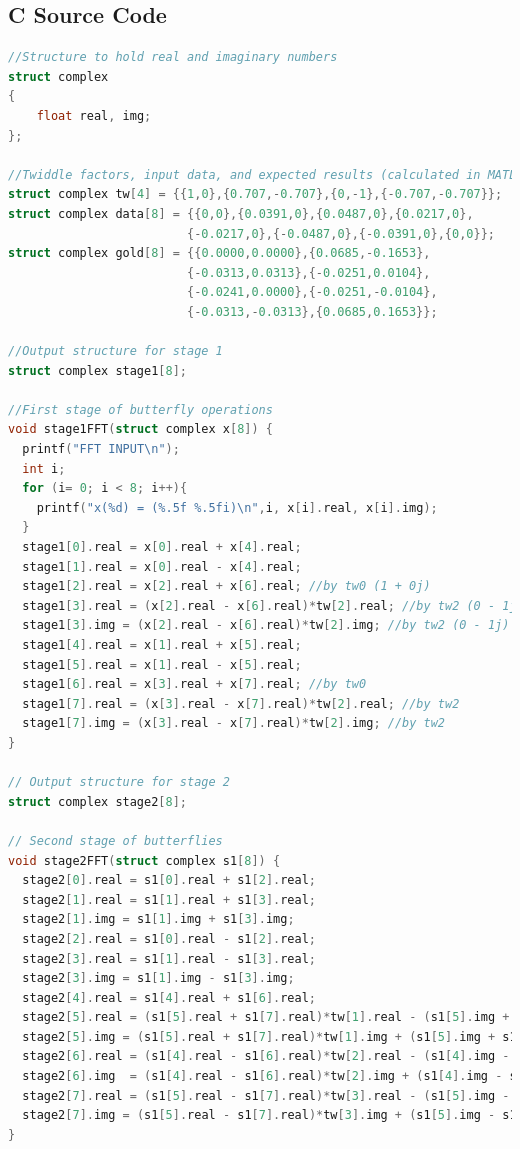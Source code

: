 \documentclass[12pt,a4paper]{report} %
\begin{document}
\begin{appendices}
\makeatletter
\def\toclevel@chapter{1}\def\toclevel@section{2}
\makeatother
\chapter{C Source Code}
\begin{lstlisting}[captionpos=b,language=C,frame=single]
//Structure to hold real and imaginary numbers
struct complex
{
    float real, img;
};

//Twiddle factors, input data, and expected results (calculated in MATLAB)
struct complex tw[4] = {{1,0},{0.707,-0.707},{0,-1},{-0.707,-0.707}};
struct complex data[8] = {{0,0},{0.0391,0},{0.0487,0},{0.0217,0},
                         {-0.0217,0},{-0.0487,0},{-0.0391,0},{0,0}};
struct complex gold[8] = {{0.0000,0.0000},{0.0685,-0.1653},
                         {-0.0313,0.0313},{-0.0251,0.0104},
                         {-0.0241,0.0000},{-0.0251,-0.0104},
                         {-0.0313,-0.0313},{0.0685,0.1653}};

//Output structure for stage 1
struct complex stage1[8];

//First stage of butterfly operations
void stage1FFT(struct complex x[8]) {
  printf("FFT INPUT\n");
  int i;
  for (i= 0; i < 8; i++){
    printf("x(%d) = (%.5f %.5fi)\n",i, x[i].real, x[i].img);
  }
  stage1[0].real = x[0].real + x[4].real;
  stage1[1].real = x[0].real - x[4].real;
  stage1[2].real = x[2].real + x[6].real; //by tw0 (1 + 0j)
  stage1[3].real = (x[2].real - x[6].real)*tw[2].real; //by tw2 (0 - 1j)
  stage1[3].img = (x[2].real - x[6].real)*tw[2].img; //by tw2 (0 - 1j)
  stage1[4].real = x[1].real + x[5].real;
  stage1[5].real = x[1].real - x[5].real;
  stage1[6].real = x[3].real + x[7].real; //by tw0
  stage1[7].real = (x[3].real - x[7].real)*tw[2].real; //by tw2
  stage1[7].img = (x[3].real - x[7].real)*tw[2].img; //by tw2
}

// Output structure for stage 2
struct complex stage2[8];

// Second stage of butterflies
void stage2FFT(struct complex s1[8]) {
  stage2[0].real = s1[0].real + s1[2].real;
  stage2[1].real = s1[1].real + s1[3].real;
  stage2[1].img = s1[1].img + s1[3].img;
  stage2[2].real = s1[0].real - s1[2].real;
  stage2[3].real = s1[1].real - s1[3].real;
  stage2[3].img = s1[1].img - s1[3].img;
  stage2[4].real = s1[4].real + s1[6].real;
  stage2[5].real = (s1[5].real + s1[7].real)*tw[1].real - (s1[5].img + s1[7].img)*tw[1].img;
  stage2[5].img = (s1[5].real + s1[7].real)*tw[1].img + (s1[5].img + s1[7].img)*tw[1].real;
  stage2[6].real = (s1[4].real - s1[6].real)*tw[2].real - (s1[4].img - s1[6].img)*tw[2].img;
  stage2[6].img  = (s1[4].real - s1[6].real)*tw[2].img + (s1[4].img - s1[6].img)*tw[2].real;
  stage2[7].real = (s1[5].real - s1[7].real)*tw[3].real - (s1[5].img - s1[7].img)*tw[3].img;
  stage2[7].img = (s1[5].real - s1[7].real)*tw[3].img + (s1[5].img - s1[7].img)*tw[3].real;
}


\end{lstlisting}
\end{appendices}
\end{document}
